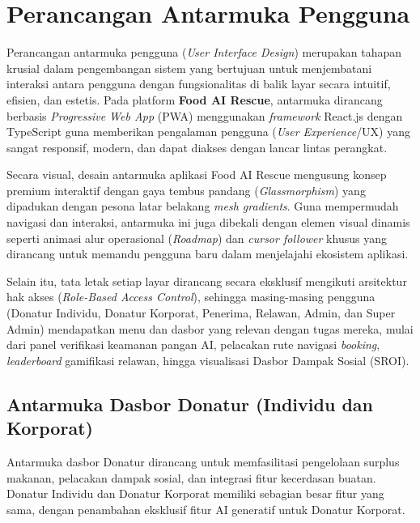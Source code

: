 \section{Perancangan Antarmuka Pengguna}

Perancangan antarmuka pengguna (\textit{User Interface Design}) merupakan tahapan krusial dalam pengembangan sistem yang bertujuan untuk menjembatani interaksi antara pengguna dengan fungsionalitas di balik layar secara intuitif, efisien, dan estetis. Pada platform \textbf{Food AI Rescue}, antarmuka dirancang berbasis \textit{Progressive Web App} (PWA) menggunakan \textit{framework} React.js dengan TypeScript guna memberikan pengalaman pengguna (\textit{User Experience}/UX) yang sangat responsif, modern, dan dapat diakses dengan lancar lintas perangkat.

Secara visual, desain antarmuka aplikasi Food AI Rescue mengusung konsep premium interaktif dengan gaya tembus pandang (\textit{Glassmorphism}) yang dipadukan dengan pesona latar belakang \textit{mesh gradients}. Guna mempermudah navigasi dan interaksi, antarmuka ini juga dibekali dengan elemen visual dinamis seperti animasi alur operasional (\textit{Roadmap}) dan \textit{cursor follower} khusus yang dirancang untuk memandu pengguna baru dalam menjelajahi ekosistem aplikasi.

Selain itu, tata letak setiap layar dirancang secara eksklusif mengikuti arsitektur hak akses (\textit{Role-Based Access Control}), sehingga masing-masing pengguna (Donatur Individu, Donatur Korporat, Penerima, Relawan, Admin, dan Super Admin) mendapatkan menu dan dasbor yang relevan dengan tugas mereka, mulai dari panel verifikasi keamanan pangan AI, pelacakan rute navigasi \textit{booking}, \textit{leaderboard} gamifikasi relawan, hingga visualisasi Dasbor Dampak Sosial (SROI).

\subsection{Antarmuka Dasbor Donatur (Individu dan Korporat)}

Antarmuka dasbor Donatur dirancang untuk memfasilitasi pengelolaan surplus makanan, pelacakan dampak sosial, dan integrasi fitur kecerdasan buatan. Donatur Individu dan Donatur Korporat memiliki sebagian besar fitur yang sama, dengan penambahan eksklusif fitur AI generatif untuk Donatur Korporat.

